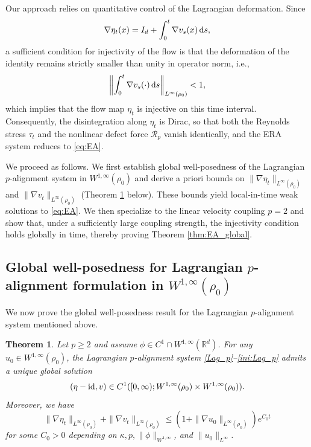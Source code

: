 \documentclass[10pt,reqno]{amsart}
\renewcommand{\ge}{\geqslant}
\renewcommand{\leq}{\leqslant}
\numberwithin{equation}{section}
\newtheorem{theorem}{Theorem}[section]
\newcommand{\R}{\mathbb R}
\newcommand{\lt}{\left}
\newcommand{\rt}{\right}
\newcommand{\calR}{\mathcal R}
\newcommand{\ds}{\textnormal{d}s}
\begin{document}
Our approach relies on quantitative control of the Lagrangian deformation. Since
\[
\nabla \eta_t(x) =  I_d + \int_0^t \nabla v_s(x)\,\ds,
\]
a sufficient condition for injectivity of the flow is that the deformation of the identity remains strictly smaller than unity in operator norm, i.e.,
\[
\lt\|\int_0^t \nabla v_s(\cdot)\,\ds \rt\|_{L^\infty(\rho_0)} < 1,
\]
which implies that the flow map $\eta_t$ is injective on this time interval. Consequently, the disintegration along $\eta_t$ is Dirac, so that both the Reynolds stress $\tau_t$ and the nonlinear defect force $\calR_p$ vanish identically, and the ERA system reduces to \eqref{eq:EA}.


We proceed as follows.  We first establish global well-posedness of the Lagrangian $p$-alignment system in $W^{1,\infty}(\rho_0)$ and derive a priori bounds on $\|\nabla \eta_t\|_{L^\infty(\rho_0)}$ and $\|\nabla v_t\|_{L^\infty(\rho_0)}$ (Theorem \ref{thm:Wp1} below).  These bounds yield local-in-time weak solutions to \eqref{eq:EA}.  We then specialize to the linear velocity coupling $p=2$ and show that, under a sufficiently large coupling strength, the injectivity condition holds globally in time, thereby proving Theorem \ref{thm:EA_global}.

 
%
%
%                      
%
%
\subsection{Global well-posedness for Lagrangian $p$-alignment formulation  in $W^{1,\infty}(\rho_0)$}  
We now prove the global well-posedness result for the Lagrangian $p$-alignment system mentioned above.

\begin{theorem} \label{thm:Wp1}
Let $p\ge2$ and assume $\phi \in C^1 \cap W^{1,\infty}(\R^d)$. For any $u_0\in W^{1,\infty}(\rho_0)$, the Lagrangian $p$-alignment system \eqref{Lag_p}--\eqref{ini:Lag_p} admits a unique global solution
\[
(\eta - {\rm id},v)\in C^1([0,\infty);W^{1,\infty}(\rho_0)\times W^{1,\infty}(\rho_0)).
\]
Moreover, we have
\[
\|\nabla \eta_t \|_{L^\infty(\rho_0)} +  \|\nabla v_t\|_{L^\infty(\rho_0)} \leq (1 + \|\nabla u_0\|_{L^\infty(\rho_0)}) e^{C_0 t}
\]
for some $C_0 > 0$ depending on $\kappa, p, \|\phi\|_{W^{1,\infty}}$, and $\|u_0\|_{L^\infty}$.
\end{theorem}
\end{document}

